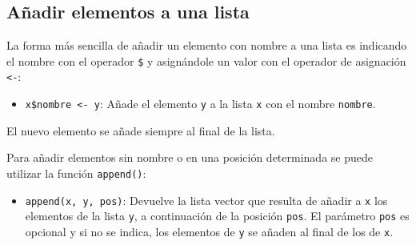 \documentclass[
  spanish,
  a4paper,
]{scrreport}
\providecommand{\tightlist}{%
  \setlength{\itemsep}{0pt}\setlength{\parskip}{0pt}}
\theoremstyle{definition}
\theoremstyle{definition}
\theoremstyle{remark}
\begin{document}
\subsection{Añadir elementos a una
lista}\label{auxf1adir-elementos-a-una-lista}

La forma más sencilla de añadir un elemento con nombre a una lista es
indicando el nombre con el operador \texttt{\$} y asignándole un valor
con el operador de asignación \texttt{\textless{}-}:

\begin{itemize}
\tightlist
\item
  \texttt{x\$nombre\ \textless{}-\ y}: Añade el elemento \texttt{y} a la
  lista \texttt{x} con el nombre \texttt{nombre}.
\end{itemize}

El nuevo elemento se añade siempre al final de la lista.

Para añadir elementos sin nombre o en una posición determinada se puede
utilizar la función \texttt{append()}:

\begin{itemize}
\tightlist
\item
  \texttt{append(x,\ y,\ pos)}: Devuelve la lista vector que resulta de
  añadir a \texttt{x} los elementos de la lista \texttt{y}, a
  continuación de la posición \texttt{pos}. El parámetro \texttt{pos} es
  opcional y si no se indica, los elementos de \texttt{y} se añaden al
  final de los de \texttt{x}.
\end{itemize}
\end{document}
